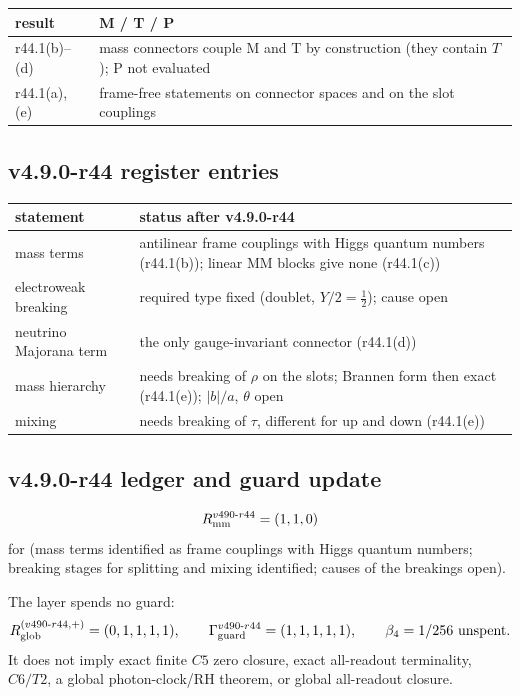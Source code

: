 \begin{center}
\small
\begin{tabular}{@{}>{\raggedright\arraybackslash}p{}>{\raggedright\arraybackslash}p{}@{}}
\toprule
result & M / T / P\\
\midrule
r44.1(b)--(d) & mass connectors couple M and T by construction (they contain \(T\)); P not evaluated\\
r44.1(a), (e) & frame-free statements on connector spaces and on the slot couplings\\
\bottomrule
\end{tabular}
\end{center}

\subsection*{v4.9.0-r44 register entries}
\label{subsec:v490-r44-register}

\begin{center}
\small
\begin{tabular}{@{}>{\raggedright\arraybackslash}p{}>{\raggedright\arraybackslash}p{}@{}}
\toprule
statement & status after v4.9.0-r44\\
\midrule
mass terms & antilinear frame couplings with Higgs quantum numbers (r44.1(b)); linear MM blocks give none (r44.1(c))\\
electroweak breaking & required type fixed (doublet, \(Y/2=\tfrac12\)); cause open\\
neutrino Majorana term & the only gauge-invariant connector (r44.1(d))\\
mass hierarchy & needs breaking of \(\rho\) on the slots; Brannen form then exact (r44.1(e)); \(|b|/a\), \(\theta\) open\\
mixing & needs breaking of \(\tau\), different for up and down (r44.1(e))\\
\bottomrule
\end{tabular}
\end{center}

\subsection*{v4.9.0-r44 ledger and guard update}
\label{subsec:v490-r44-ledger-guard}

\[
R_{\rm mm}^{v490\text{-}r44}=(1,1,0)
\]
for (mass terms identified as frame couplings with Higgs quantum numbers; breaking stages for splitting and mixing identified; causes of
the breakings open).

The layer spends no guard:
\[
R_{\rm glob}^{(v490\text{-}r44,+)}=(0,1,1,1,1),
\qquad
\Gamma_{\rm guard}^{v490\text{-}r44}=(1,1,1,1,1),
\qquad
\beta_4=1/256\ \text{unspent}.
\]
It does not imply exact finite \(C5\) zero closure, exact all-readout terminality,
\(C6/T2\), a global photon-clock/RH theorem, or global all-readout closure.
